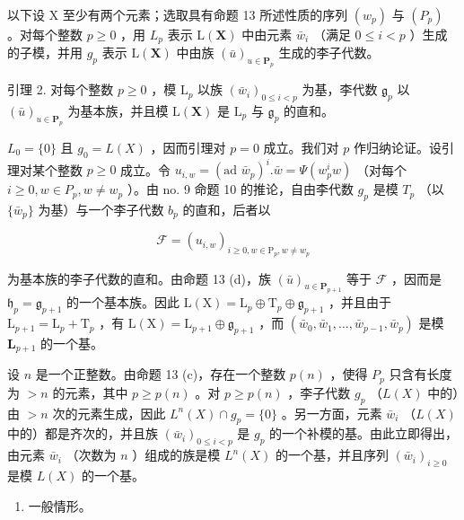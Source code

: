 以下设 X 至少有两个元素；选取具有命题 13 所述性质的序列 \((w_{p})\) 与 \((P_{p})\) 。对每个整数 \(p \geqslant 0\) ，用 \(L_{p}\) 表示 \(\mathrm{L}(\mathbf{X})\) 中由元素 \(\bar{w}_{i}\) （满足 \(0 \leqslant i < p\) ）生成的子模，并用 \(g_{p}\) 表示 \(\mathrm{L}(\mathbf{X})\) 中由族 \((\bar{u})_{u \in \mathbf{P}_{p}}\) 生成的李子代数。

引理 2. 对每个整数 \(p \geqslant 0\) ，模 \(\mathrm{L}_p\) 以族 \((\bar{w}_i)_{0 \leqslant i < p}\) 为基，李代数 \(\mathfrak{g}_p\) 以 \((\bar{u})_{u \in \mathbf{P}_p}\) 为基本族，并且模 \(\mathrm{L}(\mathbf{X})\) 是 \(\mathrm{L}_p\) 与 \(\mathfrak{g}_p\) 的直和。

\(L_{0} = \{0\}\) 且 \(g_{0} = L(X)\) ，因而引理对 \(p = 0\) 成立。我们对 \(p\) 作归纳论证。设引理对某个整数 \(p \geqslant 0\) 成立。令 \(u_{i,w} = (\text{ad } \bar{w}_{p})^{i}. \bar{w} = \Psi(w_{p}^{i} w)\) （对每个 \(i \geqslant 0, w \in P_{p}, w \neq w_{p}\) ）。由 no. 9 命题 10 的推论，自由李代数 \(g_{p}\) 是模 \(T_{p}\) （以 \(\{\bar{w}_{p}\}\) 为基）与一个李子代数 \(b_{p}\) 的直和，后者以

\[
\mathcal {F} = (u _ {i, w}) _ {i \geqslant 0, w \in \mathrm{P} _ {p}, w \neq w _ {p}}
\]

为基本族的李子代数的直和。由命题 13 (d)，族 \((\bar{u})_{u\in \mathbf{P}_{p + 1}}\) 等于 \(\mathcal{F}\) ，因而是 \(\mathfrak{h}_p = \mathfrak{g}_{p + 1}\) 的一个基本族。因此 \(\mathrm{L}(\mathrm{X}) = \mathrm{L}_p\oplus \mathrm{T}_p\oplus \mathfrak{g}_{p + 1}\) ，并且由于 \(\mathrm{L}_{p + 1} = \mathrm{L}_p + \mathrm{T}_p\) ，有 \(\mathrm{L}(\mathrm{X}) = \mathrm{L}_{p + 1}\oplus \mathfrak{g}_{p + 1}\) ，而 \((\bar{w}_0,\bar{w}_1,\dots ,\bar{w}_{p - 1},\bar{w}_p)\) 是模 \(\mathbf{L}_{p + 1}\) 的一个基。

设 \(n\) 是一个正整数。由命题 13 (c)，存在一个整数 \(p(n)\) ，使得 \(P_p\) 只含有长度为 \(>n\) 的元素，其中 \(p \geqslant p(n)\) 。对 \(p \geqslant p(n)\) ，李子代数 \(g_p\) （\(L(X)\) 中的）由 \(>n\) 次的元素生成，因此 \(L^n(X) \cap g_p = \{0\}\) 。另一方面，元素 \(\bar{w}_i\) （\(L(X)\) 中的）都是齐次的，并且族 \((\bar{w}_i)_{0 \leqslant i < p}\) 是 \(g_p\) 的一个补模的基。由此立即得出，由元素 \(\bar{w}_i\) （次数为 \(n\) ）组成的族是模 \(L^n(X)\) 的一个基，并且序列 \((\bar{w}_i)_{i \geqslant 0}\) 是模 \(L(X)\) 的一个基。

\begin{enumerate}
\def\labelenumi{(\Alph{enumi})}
\setcounter{enumi}{1}
\tightlist
\item
  一般情形。
\end{enumerate}

